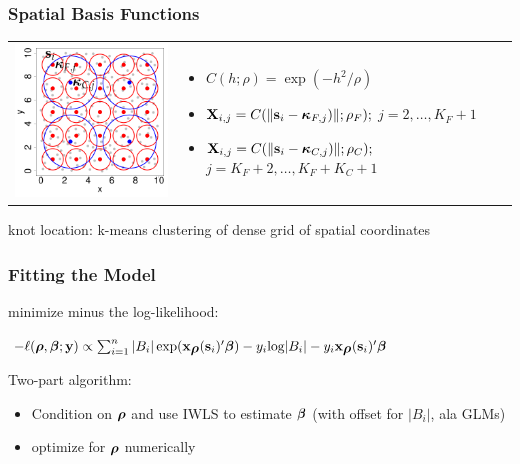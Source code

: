\documentclass[mathserif,compress]{beamer}\usepackage{graphicx, color}
\def\bs{\mathbf{s}}
\def\bx{\mathbf{x}}
\def\by{\mathbf{y}}
\def\bX{\mathbf{X}}
\def\bbeta{\mbox{\boldmath $\beta$}}
\def\bkappa{\mbox{\boldmath $\kappa$}}
\def\brho{\mbox{\boldmath $\rho$}}
\def\log{\textrm{log}}
\def\upp{^\prime}
\begin{document}

\begin{frame}[fragile]
\frametitle{Spatial Basis Functions}




	\begin{tabular}{p{5.0cm} p{5.5cm}}
		\vspace{.1cm}
		\includegraphics[width = 5.5cm]{figure/spatialBasisExplanation-plot} &
		\vspace{1cm}
		\begin{itemize}
			\item $C(h;\rho)=\exp(-h^2/\rho)$
			\item $\bX_{i,j} = C(\| \bs_i-\bkappa_{F,j})\|;\rho_F);$ \footnotesize $j = 2,\ldots,K_F + 1$
			\item $\bX_{i,j} = \normalsize C(\| \bs_i-\bkappa_{C,j})\|;\rho_C);$ \footnotesize $j = K_F + 2,\ldots,K_F + K_C + 1$
		\end{itemize}
	\end{tabular}
\footnotesize
knot location: k-means clustering of dense grid of spatial coordinates

\end{frame}


\begin{frame}[fragile]
\frametitle{Fitting the Model}

minimize minus the log-likelihood:
\begin{center}
	$-\ell(\brho,\bbeta;\by) \propto \sum_{i=1}^{n} |B_i|\exp(\bx_{\brho}(\bs_i)\upp\bbeta) - y_i\log|B_i| - y_i\bx_{\brho}(\bs_i)\upp\bbeta$
\end{center}
Two-part algorithm: 
\begin{itemize}
	\item Condition on $\brho$ and use IWLS to estimate $\bbeta$ (with offset for $|B_i|$, ala GLMs)
	\item optimize for $\brho$ numerically
\end{itemize}

\end{frame}
\end{document}
